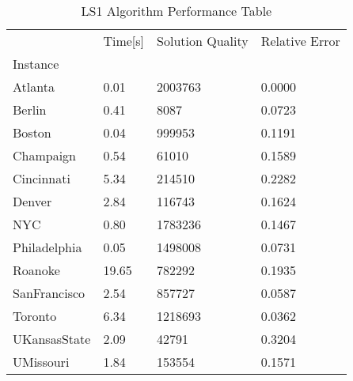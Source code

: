 \begin{table} [H]
\caption{ LS1 Algorithm Performance Table }
\begin{tabular}{llll}
\toprule
{} & Time[s] & Solution Quality & Relative Error \\
Instance     &         &                  &                \\
\midrule
Atlanta      &    0.01 &          2003763 &         0.0000 \\
Berlin       &    0.41 &             8087 &         0.0723 \\
Boston       &    0.04 &           999953 &         0.1191 \\
Champaign    &    0.54 &            61010 &         0.1589 \\
Cincinnati   &    5.34 &           214510 &         0.2282 \\
Denver       &    2.84 &           116743 &         0.1624 \\
NYC          &    0.80 &          1783236 &         0.1467 \\
Philadelphia &    0.05 &          1498008 &         0.0731 \\
Roanoke      &   19.65 &           782292 &         0.1935 \\
SanFrancisco &    2.54 &           857727 &         0.0587 \\
Toronto      &    6.34 &          1218693 &         0.0362 \\
UKansasState &    2.09 &            42791 &         0.3204 \\
UMissouri    &    1.84 &           153554 &         0.1571 \\
\bottomrule
\end{tabular}
\end{table}
